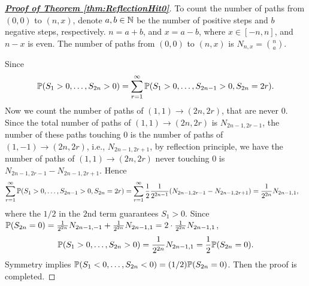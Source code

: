 \documentclass[10pt,a4paper]{article}
\begin{document}
\begin{proof}[\underline{\textbf{Proof of Theorem \ref{thm:ReflectionHit0}}}]
	To count the number of paths from $(0,0)$ to $(n,x)$, denote $a,b\in\mathbb N$ be the number of positive steps and $b$ negative steps, respectively. $n=a+b$, and $x=a-b$, where $x\in[-n,n]$, and $n-x$ is even. The number of paths from $(0,0)$ to $(n,x)$ is $N_{n,x}=\binom{n}{a}$. 
	
	Since 
	\begin{equation*}
		\mathbb P(S_{1}>0,\ldots,S_{2n}>0)=\sum_{r=1}^{\infty}\mathbb P(S_{1}>0,\ldots,S_{2n-1}>0,S_{2n}=2r).	
	\end{equation*}  
	Now we count the number of paths of $(1,1)\rightarrow(2n,2r)$, that are never 0. Since the total number of paths of $(1,1)\rightarrow(2n,2r)$ is $N_{2n-1,2r-1}$, the number of these paths touching 0 is the number of paths of $(1,-1)\rightarrow(2n,2r)$, i.e., $N_{2n-1,2r+1}$, by reflection principle, we have the number of paths of $(1,1)\rightarrow(2n,2r)$ never touching 0 is $N_{2n-1,2r-1}-N_{2n-1,2r+1}$. Hence 
	\begin{align*}
		\sum_{r=1}^{\infty}\mathbb P(S_{1}>0,\ldots,S_{2n-1}>0,S_{2n}=2r)&=\sum_{r=1}^{\infty}\frac{1}{2}\frac{1}{2^{2n-1}}(N_{2n-1,2r-1}-N_{2n-1,2r+1})=\frac{1}{2^{2n}}N_{2n-1,1},
	\end{align*}        
	where the $1/2$ in the $2$nd term guarantees $S_1>0$. Since $\mathbb P(S_{2n}=0)=\frac{1}{2^{2n}}N_{2n-1,-1}+\frac{1}{2^{2n}}N_{2n-1,1}=2\cdot \frac{1}{2^{2n}}N_{2n-1,1}$,      
	\begin{equation*}
		\mathbb P(S_{1}>0,\ldots,S_{2n}>0)=\frac{1}{2^{2n}}N_{2n-1,1}=\frac{1}{2}\mathbb P(S_{2n}=0).
	\end{equation*}
	Symmetry implies $\mathbb P(S_{1}<0,\ldots,S_{2n}<0)=(1/2)\mathbb P(S_{2n}=0)$. Then the proof is completed.
\end{proof}





\end{document}
